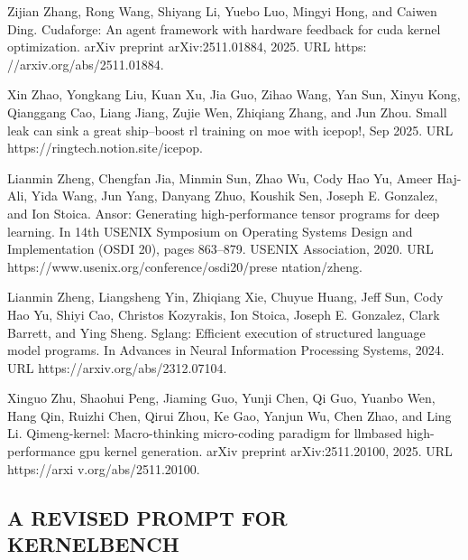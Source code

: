 \documentclass[
  10
]{article}
\begin{document}
Zijian Zhang, Rong Wang, Shiyang Li, Yuebo Luo, Mingyi Hong, and Caiwen
Ding. Cudaforge: An agent framework with hardware feedback for cuda
kernel optimization. arXiv preprint arXiv:2511.01884, 2025. URL https:
//arxiv.org/abs/2511.01884.

Xin Zhao, Yongkang Liu, Kuan Xu, Jia Guo, Zihao Wang, Yan Sun, Xinyu
Kong, Qianggang Cao, Liang Jiang, Zujie Wen, Zhiqiang Zhang, and Jun
Zhou. Small leak can sink a great ship--boost rl training on moe with
icepop!, Sep 2025. URL https://ringtech.notion.site/icepop.

Lianmin Zheng, Chengfan Jia, Minmin Sun, Zhao Wu, Cody Hao Yu, Ameer
Haj-Ali, Yida Wang, Jun Yang, Danyang Zhuo, Koushik Sen, Joseph E.
Gonzalez, and Ion Stoica. Ansor: Generating high-performance tensor
programs for deep learning. In 14th USENIX Symposium on Operating
Systems Design and Implementation (OSDI 20), pages 863--879. USENIX
Association, 2020. URL https://www.usenix.org/conference/osdi20/prese
ntation/zheng.

Lianmin Zheng, Liangsheng Yin, Zhiqiang Xie, Chuyue Huang, Jeff Sun,
Cody Hao Yu, Shiyi Cao, Christos Kozyrakis, Ion Stoica, Joseph E.
Gonzalez, Clark Barrett, and Ying Sheng. Sglang: Efficient execution of
structured language model programs. In Advances in Neural Information
Processing Systems, 2024. URL https://arxiv.org/abs/2312.07104.

Xinguo Zhu, Shaohui Peng, Jiaming Guo, Yunji Chen, Qi Guo, Yuanbo Wen,
Hang Qin, Ruizhi Chen, Qirui Zhou, Ke Gao, Yanjun Wu, Chen Zhao, and
Ling Li. Qimeng-kernel: Macro-thinking micro-coding paradigm for
llmbased high-performance gpu kernel generation. arXiv preprint
arXiv:2511.20100, 2025. URL https://arxi v.org/abs/2511.20100.

\subsection{A REVISED PROMPT FOR
KERNELBENCH}\label{a-revised-prompt-for-kernelbench}
\end{document}
